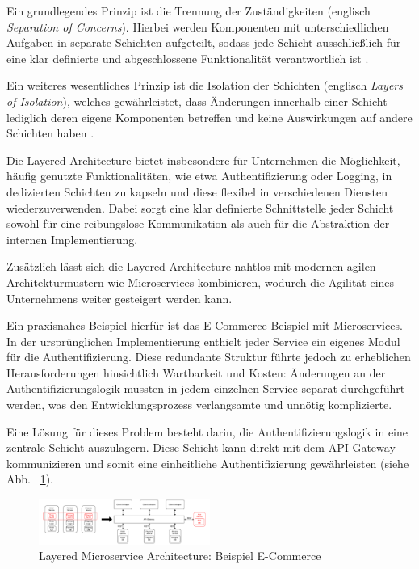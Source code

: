 \documentclass[acmtog]{acmart}
\begin{document}
Ein grundlegendes Prinzip ist die Trennung der Zuständigkeiten (englisch \textit{Separation
of Concerns}). Hierbei werden Komponenten mit unterschiedlichen Aufgaben in separate Schichten
aufgeteilt, sodass jede Schicht ausschließlich für eine klar definierte und abgeschlossene
Funktionalität verantwortlich ist \cite[34]{layered2}.

Ein weiteres wesentliches Prinzip ist die Isolation der Schichten (englisch \textit{Layers
of Isolation}), welches gewährleistet, dass Änderungen innerhalb einer Schicht lediglich
deren eigene Komponenten betreffen und keine Auswirkungen auf andere Schichten haben \cite[3–4]{architecturePatterns}.

Die Layered Architecture bietet insbesondere für Unternehmen die Möglichkeit, häufig genutzte
Funktionalitäten, wie etwa Authentifizierung oder Logging, in dedizierten Schichten zu kapseln
und diese flexibel in verschiedenen Diensten wiederzuverwenden. Dabei sorgt eine klar definierte
Schnittstelle jeder Schicht sowohl für eine reibungslose Kommunikation als auch für die
Abstraktion der internen Implementierung.

Zusätzlich lässt sich die Layered Architecture nahtlos mit modernen agilen Architekturmustern
wie Microservices kombinieren, wodurch die Agilität eines Unternehmens weiter gesteigert werden
kann.

Ein praxisnahes Beispiel hierfür ist das E-Commerce-Beispiel mit Microservices.
In der ursprünglichen Implementierung enthielt jeder Service ein eigenes Modul für die Authentifizierung. Diese
redundante Struktur führte jedoch zu erheblichen Herausforderungen hinsichtlich Wartbarkeit
und Kosten: Änderungen an der Authentifizierungslogik mussten in jedem einzelnen Service separat
durchgeführt werden, was den Entwicklungsprozess verlangsamte und unnötig komplizierte.

Eine Lösung für dieses Problem besteht darin, die Authentifizierungslogik in eine zentrale
Schicht auszulagern.
Diese Schicht kann direkt mit dem API-Gateway kommunizieren
und somit eine einheitliche Authentifizierung gewährleisten (siehe Abb. ~\ref{fig:layered}).

\begin{figure}[h!]
  \centering
  \includegraphics[width=0.5\textwidth]{images/layered/ecommerce-example}
  \caption{Layered Microservice Architecture: Beispiel E-Commerce}
  \label{fig:layered}
\end{figure}
\end{document}
